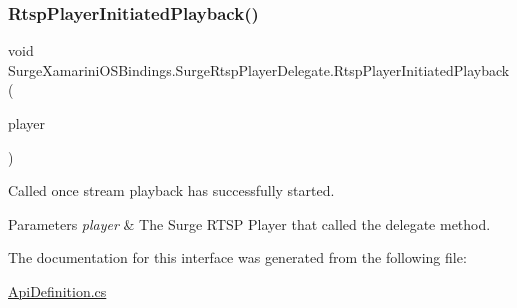 \subsubsection{\texorpdfstring{Rtsp\+Player\+Initiated\+Playback()}{RtspPlayerInitiatedPlayback()}}
{\footnotesize\ttfamily void Surge\+Xamarini\+O\+S\+Bindings.\+Surge\+Rtsp\+Player\+Delegate.\+Rtsp\+Player\+Initiated\+Playback (\begin{DoxyParamCaption}\item[{\hyperlink{interface_surge_xamarini_o_s_bindings_1_1_surge_rtsp_player}{Surge\+Rtsp\+Player}}]{player }\end{DoxyParamCaption})}



Called once stream playback has successfully started. 


\begin{DoxyParams}{Parameters}
{\em player} & The Surge R\+T\+SP Player that called the delegate method.\\
\hline
\end{DoxyParams}


The documentation for this interface was generated from the following file\+:\begin{DoxyCompactItemize}
\item 
\hyperlink{_api_definition_8cs}{Api\+Definition.\+cs}\end{DoxyCompactItemize}

